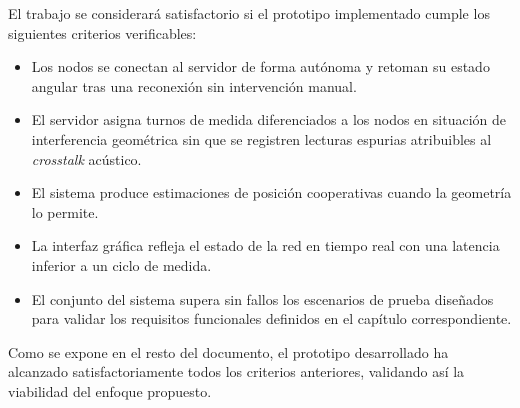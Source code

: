 El trabajo se considerará satisfactorio si el prototipo implementado cumple los siguientes criterios verificables:

\begin{itemize}
    \item Los nodos se conectan al servidor de forma autónoma y retoman su estado angular tras una reconexión sin intervención manual.
    \item El servidor asigna turnos de medida diferenciados a los nodos en situación de interferencia geométrica sin que se registren lecturas espurias atribuibles al \textit{crosstalk} acústico.
    \item El sistema produce estimaciones de posición cooperativas cuando la geometría lo permite.
    \item La interfaz gráfica refleja el estado de la red en tiempo real con una latencia inferior a un ciclo de medida.
    \item El conjunto del sistema supera sin fallos los escenarios de prueba diseñados para validar los requisitos funcionales definidos en el capítulo correspondiente.
\end{itemize}

Como se expone en el resto del documento, el prototipo desarrollado ha alcanzado satisfactoriamente todos los criterios anteriores, validando así la viabilidad del enfoque propuesto.
